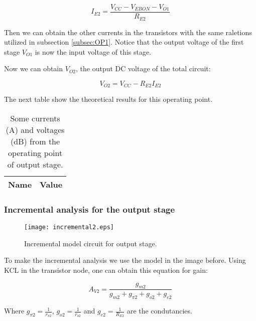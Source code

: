 \begin{equation}
I_{E2}=\frac{V_{CC}-V_{EBON}-V_{O1}}{R_{E2}}
\end{equation}
 
\par Then we can obtain the other currents in the transistors with the same raletions utilized in subsection \ref{subsec:OP1}. Notice that the output voltage of the first stage $V_{O1}$ is now the input voltage of this stage.
\par Now we can obtain $V_{O2}$, the output DC voltage of the total circuit:

\begin{equation}
V_{O2}=V_{CC}- R_{E2}I_{E2}
\end{equation} 
 
 \par The next table show the theoretical results for this operating point.
 
 \begin{table}[H]
    \centering
    \begin{tabular}{|l|r|}
    \hline    
    {\bf Name} & {\bf Value} \\ \hline
    
    \end{tabular}
     \caption{Some currents (A) and voltages (dB) from the operating point of output stage.}
    \label{tab:op2}
  \end{table}
 
 \subsubsection{Incremental analysis for the output stage}
 
 \begin{figure}[H] \centering
\texttt{[image: incremental2.eps]}
\caption{Incremental model circuit for output stage.}
\label{fig:incremental2}
\end{figure}
 
 \par To make the incremental analysis we use the model in the image before. Using KCL in the transistor node, one can obtain this equation for gain:
 
 \begin{equation}
 A_{V2} = \frac{g_{m2}}{g_{m2}+g_{\pi 2}+g_{o2}+g_{e2}}
 \end{equation}
 
 \par Where $g_{\pi 2}=\frac{1}{r_{\pi 2}}$, $g_{o2}=\frac{1}{r_{o2}}$ and $g_{e2}=\frac{1}{R_{E2}}$ are the condutancies.
 
